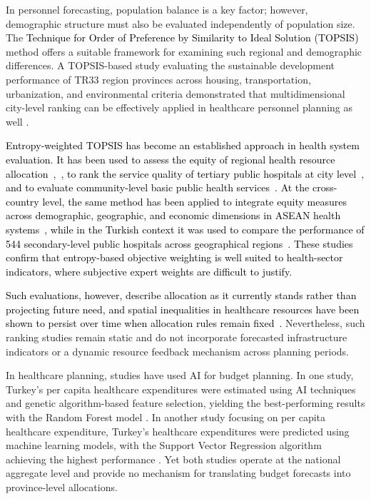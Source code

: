 \documentclass[final, 9pt, twocolumn]{saucis}
\newcommand{\rev}[1]{\textcolor{black}{#1}}
\begin{document}
In personnel forecasting, population balance is a key factor; however, demographic structure must also be evaluated independently of population size. The \rev{Technique for Order of Preference by Similarity to Ideal Solution (TOPSIS)} method offers a suitable framework for examining such regional and demographic differences. A TOPSIS-based study evaluating the sustainable development performance of TR33 region provinces across housing, transportation, urbanization, and environmental criteria demonstrated that multidimensional city-level ranking can be effectively applied in healthcare personnel planning as well \cite{intro10}.

\rev{Entropy-weighted TOPSIS has become an established approach in health
system evaluation. It has been used to assess the equity of regional health
resource allocation~\cite{lit3},~\cite{lit6}, to rank the service quality of
tertiary public hospitals at city level~\cite{lit4}, and to evaluate
community-level basic public health services~\cite{lit5}. At the cross-country
level, the same method has been applied to integrate equity measures across
demographic, geographic, and economic dimensions in ASEAN health
systems~\cite{lit2}, while in the Turkish context it was used to compare the
performance of 544 secondary-level public hospitals across geographical
regions~\cite{lit1}. These studies confirm that entropy-based objective
weighting is well suited to health-sector indicators, where subjective expert
weights are difficult to justify.}

\rev{Such evaluations, however, describe allocation as it currently stands
rather than projecting future need, and spatial inequalities in healthcare
resources have been shown to persist over time when allocation rules remain
fixed~\cite{lit7}.} Nevertheless, such ranking studies remain static and do not
incorporate forecasted infrastructure indicators or a dynamic resource feedback
mechanism across planning periods.

In healthcare planning, studies have used AI for budget planning. In one study, Turkey's per capita healthcare expenditures were estimated using AI techniques and genetic algorithm-based feature selection, yielding the best-performing results with the Random Forest model \cite{intro11}. In another study focusing on per capita healthcare expenditure, Turkey's healthcare expenditures were predicted using machine learning models, with the Support Vector Regression algorithm achieving the highest performance \cite{intro12}. Yet both studies operate at the national aggregate level and provide no mechanism for translating budget forecasts into province-level allocations.
\end{document}
